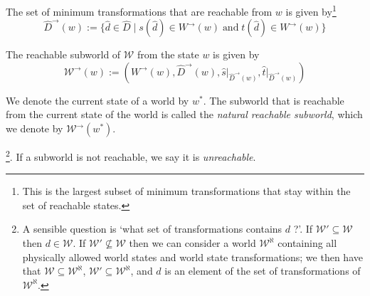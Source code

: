The set of minimum transformations that are reachable from $w$ is given by\footnote{
This is the largest subset of minimum transformations that stay within the set of reachable states.
}
\begin{equation}
    \hat{D}^{\to}(w) := \{ \hat{d} \in \hat{D} \mid s(\hat{d}) \in W^{\to}(w) \; \text{and} \; t(\hat{d}) \in W^{\to}(w) \}
\end{equation}

The reachable subworld of $\mathscr{W}$ from the state $w$ is given by
\begin{equation}
    \mathscr{W}^{\to}(w) := (W^{\to}(w), \hat{D}^{\to}(w), \hat{s} \big|_{\hat{D}^{\to}(w)}, \hat{t} \big|_{\hat{D}^{\to}(w)})
\end{equation}

We denote the current state of a world by $w^{*}$.
The subworld that is reachable from the current state of the world is called the \emph{natural reachable subworld}, which we denote by $\mathscr{W}^{\to}(w^{*})$.






\footnote{
	A sensible question is `what set of transformations contains $d$ ?'.
	If $\mathscr{W}' \subseteq \mathscr{W}$ then $d \in \mathscr{W}$.
	If $\mathscr{W}' \not\subseteq \mathscr{W}$ then we can consider a world $\mathscr{W}^{\aleph}$ containing all physically allowed world states and world state transformations; we then have that $\mathscr{W} \subseteq \mathscr{W}^{\aleph}$, $\mathscr{W}' \subseteq \mathscr{W}^{\aleph}$, and $d$ is an element of the set of transformations of $\mathscr{W}^{\aleph}$.
}.
If a subworld is not reachable, we say it is \emph{unreachable}.


